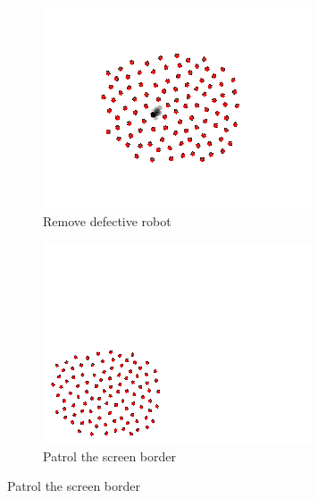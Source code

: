 \documentclass[]{article}
\begin{document}
\begin{figure}
\begin{subfigure}{0.42\textwidth}
		\includegraphics[width=\linewidth]{slide_images/Swarm_Robot_Control_-_100_Robot_0031.png}
		\caption{Remove defective robot}
		\label{fig:sub2}
	\end{subfigure}%
	\begin{subfigure}{0.42\textwidth}
		\centering
		\includegraphics[width=\linewidth]{slide_images/Swarm_Robot_Control_-_100_Robot_0033.png}
		\caption{Patrol the screen border}
		\label{fig:sub1}
	\end{subfigure}
\end{figure}
\end{document}
